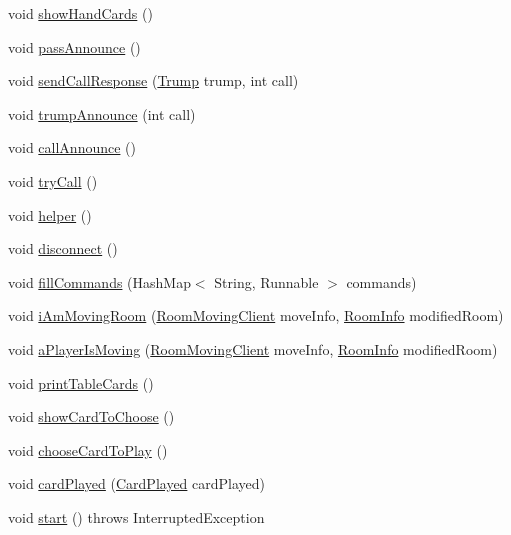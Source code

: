 \begin{DoxyCompactItemize}
\item 
void \mbox{\hyperlink{classClient_1_1Controller_a82502998a9b3553fb2ab6430f5b4c423}{show\+Hand\+Cards}} ()
\item 
void \mbox{\hyperlink{classClient_1_1Controller_ad5bc67e5929bedf225177d9df9179bfa}{pass\+Announce}} ()
\item 
void \mbox{\hyperlink{classClient_1_1Controller_a8d3cf754e228f3ca544c718a27f7877c}{send\+Call\+Response}} (\mbox{\hyperlink{enumCommon_1_1Trump}{Trump}} trump, int call)
\item 
void \mbox{\hyperlink{classClient_1_1Controller_af842d2577950491742f5843b6c8c2a93}{trump\+Announce}} (int call)
\item 
void \mbox{\hyperlink{classClient_1_1Controller_a01335f929950989cf1723b1b845cdd6d}{call\+Announce}} ()
\item 
void \mbox{\hyperlink{classClient_1_1Controller_ab188da27fe6cdc563242921dc3028764}{try\+Call}} ()
\item 
void \mbox{\hyperlink{classClient_1_1Controller_af7c67fae279ad06b4513ef68ac71294c}{helper}} ()
\item 
void \mbox{\hyperlink{classClient_1_1Controller_a36f8d304cc2e332a5cab8152dc85d2c0}{disconnect}} ()
\item 
void \mbox{\hyperlink{classClient_1_1Controller_af9f113ff4ab7d8cd478289337df6a423}{fill\+Commands}} (Hash\+Map$<$ String, Runnable $>$ commands)
\item 
void \mbox{\hyperlink{classClient_1_1Controller_a71280e16a0746357f5a7302cfb6a0ac8}{i\+Am\+Moving\+Room}} (\mbox{\hyperlink{classCommon_1_1RoomMovingClient}{Room\+Moving\+Client}} move\+Info, \mbox{\hyperlink{classCommon_1_1RoomInfo}{Room\+Info}} modified\+Room)
\item 
void \mbox{\hyperlink{classClient_1_1Controller_a880e33fad7f0f2ad543ead04bcd6d2b7}{a\+Player\+Is\+Moving}} (\mbox{\hyperlink{classCommon_1_1RoomMovingClient}{Room\+Moving\+Client}} move\+Info, \mbox{\hyperlink{classCommon_1_1RoomInfo}{Room\+Info}} modified\+Room)
\item 
void \mbox{\hyperlink{classClient_1_1Controller_a0998c48fef0c6299b77d130b0e0e55e9}{print\+Table\+Cards}} ()
\item 
void \mbox{\hyperlink{classClient_1_1Controller_a09f717b23bc1405a9376b308797f8bd1}{show\+Card\+To\+Choose}} ()
\item 
void \mbox{\hyperlink{classClient_1_1Controller_ab9335d600e913fdff0adec8b7f2e7e8a}{choose\+Card\+To\+Play}} ()
\item 
void \mbox{\hyperlink{classClient_1_1Controller_a00dd0f9866d799470fa967da62f8964b}{card\+Played}} (\mbox{\hyperlink{classCommon_1_1CardPlayed}{Card\+Played}} card\+Played)
\item 
void \mbox{\hyperlink{classClient_1_1Controller_ae9bd948fb834b86f9b6bee647082bda9}{start}} ()  throws Interrupted\+Exception 
\end{DoxyCompactItemize}


